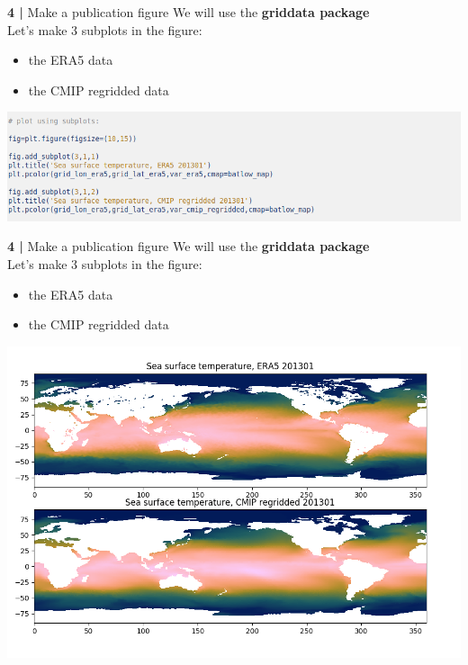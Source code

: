 \begin{frame}{\textbf{4 |} Make a publication figure} 
    We will use the \textbf{griddata package}\\
        \vspace{0.3cm} 
    Let's make 3 subplots in the figure: \\
    \begin{itemize}
        \item the ERA5 data
        \item the CMIP regridded data
    \end{itemize}
    \includegraphics[scale=0.35]{images/Script5_step4.png}
\end{frame}

\begin{frame}{\textbf{4 |} Make a publication figure} 
    We will use the \textbf{griddata package}\\
        \vspace{0.3cm} 
    Let's make 3 subplots in the figure: \\
    \begin{itemize}
        \item the ERA5 data
        \item the CMIP regridded data
    \end{itemize}
    \includegraphics[scale=0.30]{images/script5_fig1.png}
\end{frame}


